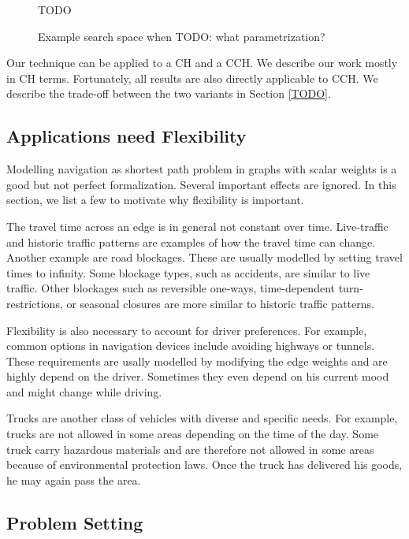 \documentclass[sigconf]{acmart}
\begin{document}
\begin{figure}
TODO

\caption{Example search space when TODO: what parametrization?}
\label{img:search-space}
\end{figure}

Our technique can be applied to a CH and a CCH.
We describe our work mostly in CH terms.
Fortunately, all results are also directly applicable to CCH.
We describe the trade-off between the two variants in Section \ref{TODO}.

\subsection{Applications need Flexibility}

Modelling navigation as shortest path problem in graphs with scalar weights is a good but not perfect formalization.
Several important effects are ignored.
In this section, we list a few to motivate why flexibility is important.

The travel time across an edge is in general not constant over time.
Live-traffic and historic traffic patterns are examples of how the travel time can change.
Another example are road blockages.
These are usually modelled by setting travel times to infinity.
Some blockage types, such as accidents, are similar to live traffic.
Other blockages such as reversible one-ways, time-dependent turn-restrictions, or seasonal closures are more similar to historic traffic patterns.

Flexibility is also necessary to account for driver preferences.
For example, common options in navigation devices include avoiding highways or tunnels.
These requirements are usally modelled by modifying the edge weights and are highly depend on the driver.
Sometimes they even depend on his current mood and might change while driving.

Trucks are another class of vehicles with diverse and specific needs.
For example, trucks are not allowed in some areas depending on the time of the day.
Some truck carry hazardous materials and are therefore not allowed in some areas because of environmental protection laws.
Once the truck has delivered his goods, he may again pass the area.

\subsection{Problem Setting}
\end{document}
